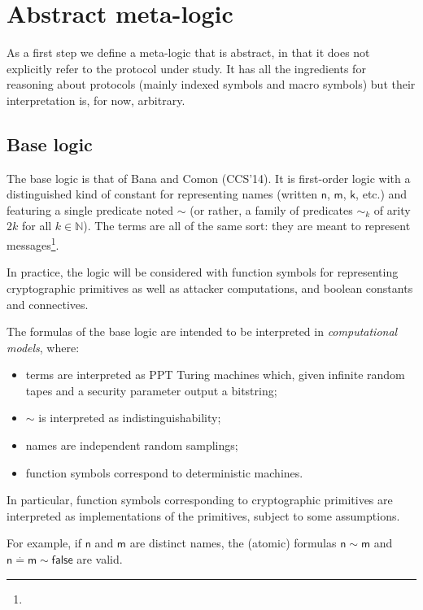 \section{Abstract meta-logic}

As a first step we define a meta-logic that is abstract, in that it does
not explicitly refer to the protocol under study. It has all the ingredients
for reasoning about protocols (mainly indexed symbols and macro symbols)
but their interpretation is, for now, arbitrary.

\subsection{Base logic}

The base logic is that of Bana and Comon (CCS'14). It is first-order logic
with a distinguished kind of constant for representing names (written
$\mathsf{n}$, $\mathsf{m}$, $\mathsf{k}$, etc.)
and featuring a single predicate noted $\sim$ (or rather, a family
of predicates $\sim_k$ of arity $2 k$ for all $k\in\mathbb{N}$).
The terms are all of the same sort: they are meant to represent
messages\footnote{
}.

In practice, the logic will be considered with function symbols for
representing cryptographic primitives as well as attacker computations, and
boolean constants and connectives.

The formulas of the base logic are intended to be interpreted in
\emph{computational models}, where:
\begin{itemize}
  \item terms are interpreted as PPT Turing machines which,
    given infinite random tapes and a security parameter output a bitstring;
  \item $\sim$ is interpreted as indistinguishability;
  \item names are independent random samplings;
  \item function symbols correspond to deterministic machines.
\end{itemize}

In particular, function symbols corresponding to cryptographic primitives
are interpreted as implementations of the primitives, subject to some
assumptions.

For example, if $\mathsf{n}$ and $\mathsf{m}$ are distinct names,
the (atomic) formulas $\mathsf{n}\sim\mathsf{m}$ and
$\mathsf{n}\stackrel{.}{=}\mathsf{m}\sim\mathsf{false}$
are valid.

